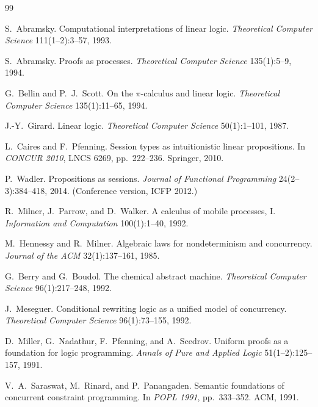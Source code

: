 \documentclass[11pt]{article}
\theoremstyle{definition}
\theoremstyle{plain}
\begin{document}
\begin{thebibliography}{99}
\small

 S.~Abramsky.
\newblock Computational interpretations of linear logic.
\newblock \emph{Theoretical Computer Science} 111(1--2):3--57, 1993.

 S.~Abramsky.
\newblock Proofs as processes.
\newblock \emph{Theoretical Computer Science} 135(1):5--9, 1994.

 G.~Bellin and P.~J.~Scott.
\newblock On the $\pi$-calculus and linear logic.
\newblock \emph{Theoretical Computer Science} 135(1):11--65, 1994.

 J.-Y.~Girard.
\newblock Linear logic.
\newblock \emph{Theoretical Computer Science} 50(1):1--101, 1987.

 L.~Caires and F.~Pfenning.
\newblock Session types as intuitionistic linear propositions.
\newblock In \emph{CONCUR 2010}, LNCS 6269, pp.~222--236. Springer, 2010.

 P.~Wadler.
\newblock Propositions as sessions.
\newblock \emph{Journal of Functional Programming} 24(2--3):384--418, 2014.
(Conference version, ICFP 2012.)

 R.~Milner, J.~Parrow, and D.~Walker.
\newblock A calculus of mobile processes, I.
\newblock \emph{Information and Computation} 100(1):1--40, 1992.

 M.~Hennessy and R.~Milner.
\newblock Algebraic laws for nondeterminism and concurrency.
\newblock \emph{Journal of the ACM} 32(1):137--161, 1985.

 G.~Berry and G.~Boudol.
\newblock The chemical abstract machine.
\newblock \emph{Theoretical Computer Science} 96(1):217--248, 1992.

 J.~Meseguer.
\newblock Conditional rewriting logic as a unified model of concurrency.
\newblock \emph{Theoretical Computer Science} 96(1):73--155, 1992.

 D.~Miller, G.~Nadathur, F.~Pfenning, and A.~Scedrov.
\newblock Uniform proofs as a foundation for logic programming.
\newblock \emph{Annals of Pure and Applied Logic} 51(1--2):125--157, 1991.

 V.~A.~Saraswat, M.~Rinard, and P.~Panangaden.
\newblock Semantic foundations of concurrent constraint programming.
\newblock In \emph{POPL 1991}, pp.~333--352. ACM, 1991.


\end{thebibliography}
\end{document}
